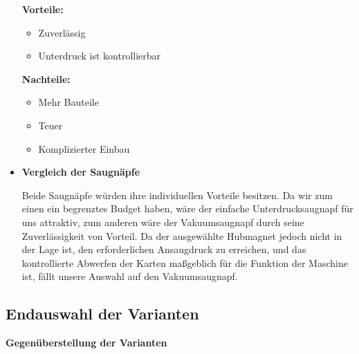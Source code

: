 \begin{itemize}
    \textbf{Vorteile:}
    \begin{itemize}
        \item Zuverlässig
        \item Unterdruck ist kontrollierbar
    \end{itemize}
    \textbf{Nachteile:}
    \begin{itemize}
        \item Mehr Bauteile
        \item Teuer
        \item Komplizierter Einbau
    \end{itemize}
    \pagebreak
    \item \textbf{Vergleich der Saugnäpfe}


    Beide Saugnäpfe würden ihre individuellen Vorteile besitzen.
    Da wir zum einen ein begrenztes Budget haben, wäre der einfache Unterdrucksaugnapf für uns attraktiv, zum anderen wäre der Vakuumsaugnapf durch seine Zuverlässigkeit von Vorteil.
    Da der ausgewählte Hubmagnet jedoch nicht in der Lage ist, den erforderlichen Ansaugdruck zu erreichen,
    und das kontrollierte Abwerfen der Karten maßgeblich für die Funktion der Maschine ist, fällt unsere Auswahl auf den Vakuumsaugnapf.
\end{itemize}

\subsection{Endauswahl der Varianten}

\textbf{\large{Gegenüberstellung der Varianten}}

